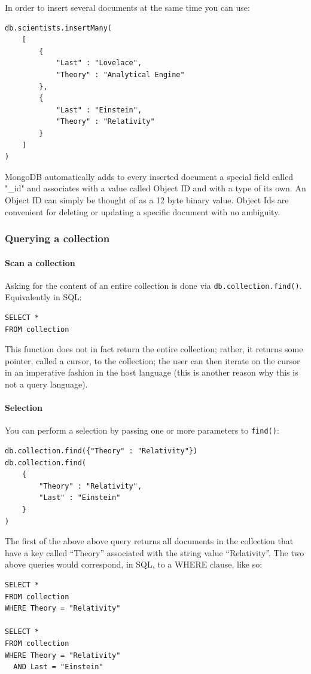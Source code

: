 In order to insert several documents at the same time you can use:

\begin{lstlisting}[style=neutral]
db.scientists.insertMany(
    [
        {
            "Last" : "Lovelace",
            "Theory" : "Analytical Engine"
        },
        {
            "Last" : "Einstein",
            "Theory" : "Relativity"
        }
    ]
)
\end{lstlisting}

MongoDB automatically adds to every inserted document a special field called "\_id" and associates with a value called Object ID and with a type of its own. An Object ID can simply be thought of as a 12 byte binary value. Object Ids are convenient for deleting or updating a specific document with no ambiguity.

\subsubsection{Querying a collection}

\paragraph{Scan a collection}
Asking for the content of an entire collection is done via \texttt{db.collection.find()}. Equivalently in SQL:
\begin{lstlisting}[style=neutral]
SELECT *
FROM collection
\end{lstlisting}
This function does not in fact return the entire collection; rather, it returns some pointer, called a cursor, to the collection; the user can then iterate on the cursor in an imperative fashion in the host language (this is another reason why this is not a query language).

\paragraph{Selection}
You can perform a selection by passing one or more parameters to \texttt{find()}:
\begin{lstlisting}[style=neutral]
db.collection.find({"Theory" : "Relativity"})
db.collection.find(
    {
        "Theory" : "Relativity",
        "Last" : "Einstein"
    }
)
\end{lstlisting}
The first of the above above query returns all documents in the collection that have a key called “Theory” associated with the string value “Relativity”. The two above queries would correspond, in SQL, to a WHERE clause, like so:
\begin{lstlisting}[style=neutral]
SELECT *
FROM collection
WHERE Theory = "Relativity"

SELECT *
FROM collection
WHERE Theory = "Relativity"
  AND Last = "Einstein"
\end{lstlisting}

